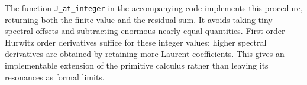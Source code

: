 The function \texttt{J\_at\_integer} in the accompanying code implements
this procedure, returning both the finite value and the residual sum.
It avoids taking tiny spectral offsets and subtracting enormous nearly
equal quantities. First-order Hurwitz order derivatives suffice for these
integer values; higher spectral derivatives are obtained by retaining
more Laurent coefficients. This gives an implementable extension of the
primitive calculus rather than leaving its resonances as formal limits.
